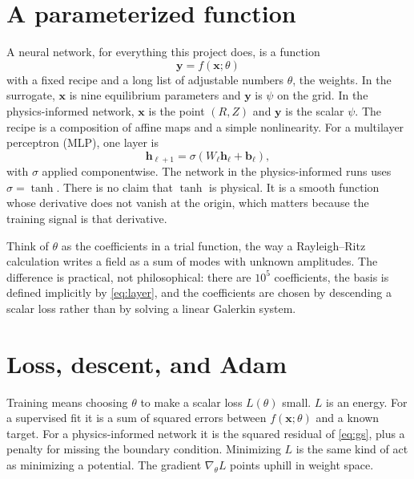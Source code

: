 \documentclass[11pt,a4paper,oneside,openany]{book}
\numberwithin{equation}{chapter}
\newcommand{\grad}{\nabla}
\theoremstyle{definition}
\begin{document}
\section{A parameterized function}

A neural network, for everything this project does, is a function
\begin{equation}
\label{eq:nn}
\mathbf{y}=f(\mathbf{x};\theta)
\end{equation}
with a fixed recipe and a long list of adjustable numbers \(\theta\), the weights. In the surrogate, \(\mathbf{x}\) is nine equilibrium parameters and \(\mathbf{y}\) is \(\psi\) on the grid. In the physics-informed network, \(\mathbf{x}\) is the point \((R,Z)\) and \(\mathbf{y}\) is the scalar \(\psi\). The recipe is a composition of affine maps and a simple nonlinearity. For a multilayer perceptron (MLP), one layer is
\begin{equation}
\label{eq:layer}
\mathbf{h}_{\ell+1}=\sigma(W_{\ell}\mathbf{h}_{\ell}+\mathbf{b}_{\ell}),
\end{equation}
with \(\sigma\) applied componentwise. The network in the physics-informed runs uses \(\sigma=\tanh\). There is no claim that \(\tanh\) is physical. It is a smooth function whose derivative does not vanish at the origin, which matters because the training signal is that derivative.

Think of \(\theta\) as the coefficients in a trial function, the way a Rayleigh--Ritz calculation writes a field as a sum of modes with unknown amplitudes. The difference is practical, not philosophical: there are \(10^{5}\) coefficients, the basis is defined implicitly by \eqref{eq:layer}, and the coefficients are chosen by descending a scalar loss rather than by solving a linear Galerkin system.

\section{Loss, descent, and Adam}

Training means choosing \(\theta\) to make a scalar loss \(L(\theta)\) small. \(L\) is an energy. For a supervised fit it is a sum of squared errors between \(f(\mathbf{x};\theta)\) and a known target. For a physics-informed network it is the squared residual of \eqref{eq:gs}, plus a penalty for missing the boundary condition. Minimizing \(L\) is the same kind of act as minimizing a potential. The gradient \(\grad_{\theta} L\) points uphill in weight space.
\end{document}

